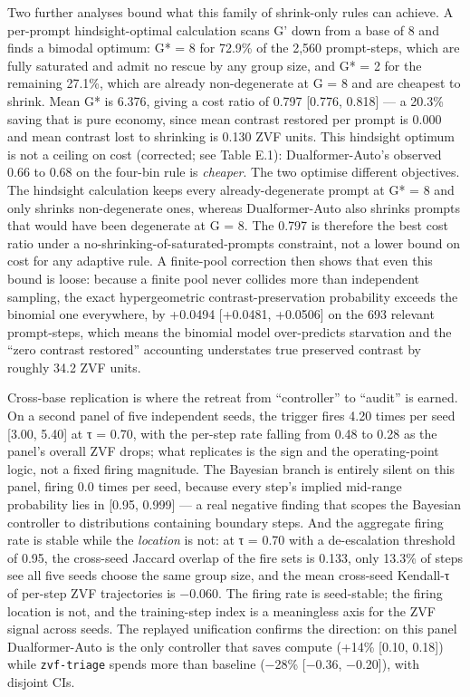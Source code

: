 \documentclass[12pt,a4paper]{report}
\begin{document}
Two further analyses bound what this family of shrink-only rules can
achieve. A per-prompt hindsight-optimal calculation scans G' down from a
base of 8 and finds a bimodal optimum: G* = 8 for 72.9\% of the 2,560
prompt-steps, which are fully saturated and admit no rescue by any group
size, and G* = 2 for the remaining 27.1\%, which are already
non-degenerate at G = 8 and are cheapest to shrink. Mean G* is 6.376,
giving a cost ratio of 0.797 {[}0.776, 0.818{]} --- a 20.3\% saving that
is pure economy, since mean contrast restored per prompt is 0.000 and
mean contrast lost to shrinking is 0.130 ZVF units. This hindsight
optimum is not a ceiling on cost (corrected; see Table E.1):
Dualformer-Auto's observed 0.66 to 0.68 on the four-bin rule is
\emph{cheaper}. The two optimise different objectives. The hindsight
calculation keeps every already-degenerate prompt at G* = 8 and only
shrinks non-degenerate ones, whereas Dualformer-Auto also shrinks
prompts that would have been degenerate at G = 8. The 0.797 is therefore
the best cost ratio under a no-shrinking-of-saturated-prompts
constraint, not a lower bound on cost for any adaptive rule. A
finite-pool correction then shows that even this bound is loose: because
a finite pool never collides more than independent sampling, the exact
hypergeometric contrast-preservation probability exceeds the binomial
one everywhere, by +0.0494 {[}+0.0481, +0.0506{]} on the 693 relevant
prompt-steps, which means the binomial model over-predicts starvation
and the ``zero contrast restored'' accounting understates true preserved
contrast by roughly 34.2 ZVF units.

Cross-base replication is where the retreat from ``controller'' to
``audit'' is earned. On a second panel of five independent seeds, the
trigger fires 4.20 times per seed {[}3.00, 5.40{]} at τ = 0.70, with the
per-step rate falling from 0.48 to 0.28 as the panel's overall ZVF
drops; what replicates is the sign and the operating-point logic, not a
fixed firing magnitude. The Bayesian branch is entirely silent on this
panel, firing 0.0 times per seed, because every step's implied mid-range
probability lies in {[}0.95, 0.999{]} --- a real negative finding that
scopes the Bayesian controller to distributions containing boundary
steps. And the aggregate firing rate is stable while the \emph{location}
is not: at τ = 0.70 with a de-escalation threshold of 0.95, the
cross-seed Jaccard overlap of the fire sets is 0.133, only 13.3\% of
steps see all five seeds choose the same group size, and the mean
cross-seed Kendall-τ of per-step ZVF trajectories is −0.060. The firing
rate is seed-stable; the firing location is not, and the training-step
index is a meaningless axis for the ZVF signal across seeds. The
replayed unification confirms the direction: on this panel
Dualformer-Auto is the only controller that saves compute (+14\%
{[}0.10, 0.18{]}) while \texttt{zvf-triage} spends more than baseline
(−28\% {[}−0.36, −0.20{]}), with disjoint CIs.
\end{document}
